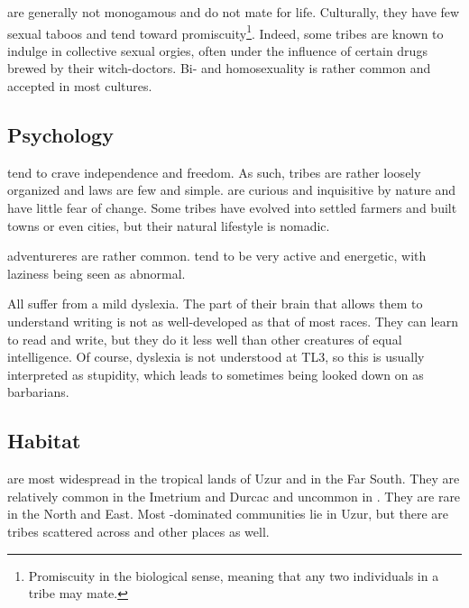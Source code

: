 \Meccara{} are generally not monogamous and do not mate for life. Culturally, they have few sexual taboos and tend toward promiscuity\footnote{Promiscuity in the biological sense, meaning that any two individuals in a tribe may mate.}. Indeed, some tribes are known to indulge in collective sexual orgies, often under the influence of certain drugs brewed by their witch-doctors. Bi- and homosexuality is rather common and accepted in most cultures. 









\subsection{Psychology}
\Meccara{} tend to crave independence and freedom. As such, \meccaran{} tribes are rather loosely organized and laws are few and simple. \Meccara{} are curious and inquisitive by nature and have little fear of change. Some tribes have evolved into settled farmers and built towns or even cities, but their natural lifestyle is nomadic. 

\Meccaran{} adventureres are rather common. \Meccara{} tend to be very active and energetic, with laziness being seen as abnormal. 

All \meccara{} suffer from a mild dyslexia. The part of their brain that allows them to understand writing is not as well-developed as that of most races. They can learn to read and write, but they do it less well than other creatures of equal intelligence. Of course, dyslexia is not understood at TL3, so this is usually interpreted as stupidity, which leads to \meccarans{} sometimes being looked down on as barbarians. 









\subsection{Habitat}
\Meccara{} are most widespread in the tropical lands of Uzur and in the Far South. They are relatively common in the Imetrium and Durcac and uncommon in \Velcad{}. They are rare in the North and East. Most \meccara{}-dominated communities lie in Uzur, but there are \meccaran{} tribes scattered across \Velcad{} and other places as well. 















